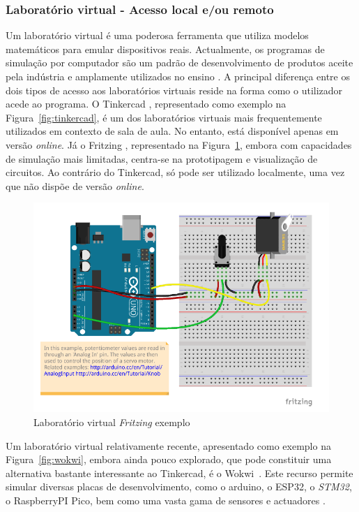 \subsubsection{Laboratório virtual - Acesso local e/ou remoto}
Um laboratório virtual é uma poderosa ferramenta que utiliza modelos matemáticos para emular dispositivos reais. Actualmente, os programas de simulação por computador são um padrão de desenvolvimento de produtos aceite pela indústria e amplamente utilizados no ensino \cite{HERADIO20161, POTKONJAK2016309}. A principal diferença entre os dois tipos de acesso aos laboratórios virtuais reside na forma como o utilizador acede ao programa. O Tinkercad \cite{tinkercad}, representado como exemplo na Figura~\ref{fig:tinkercad}, é um dos laboratórios virtuais mais frequentemente utilizados em contexto de sala de aula. No entanto, está disponível apenas em versão \textit{online}. Já o Fritzing \cite{fritzingdown}, representado na Figura~\ref{fig:fritzing}, embora com capacidades de simulação mais limitadas, centra-se na prototipagem e visualização de circuitos. Ao contrário do Tinkercad, só pode ser utilizado localmente, uma vez que não dispõe de versão \textit{online}.

\begin{figure}[hbtp]
    \centering
    \includegraphics[width=0.6\linewidth]{figures/fritzing.png}
    \caption{Laboratório virtual \textit{Fritzing} exemplo}
    \label{fig:fritzing}
\end{figure}

Um laboratório virtual relativamente recente, apresentado como exemplo na Figura~\ref{fig:wokwi}, embora ainda pouco explorado, que pode constituir uma alternativa bastante interessante ao Tinkercad, é o Wokwi~\cite{wokwi}. Este recurso permite simular diversas placas de desenvolvimento, como o \gls{arduino}, o \gls{ESP32}, o \textit{STM32}, o \gls{RaspberryPI} Pico, bem como uma vasta gama de sensores e actuadores \cite{wokwi}.

